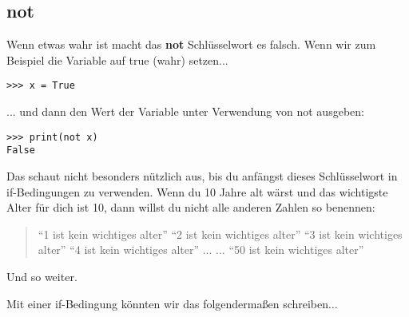 \subsection*{not}

Wenn etwas wahr ist macht das \textbf{not} Schlüsselwort es falsch. Wenn wir zum Beispiel die Variable  auf true (wahr) setzen...

\begin{Verbatim}[frame=single]
>>> x = True
\end{Verbatim}

... und dann den Wert der Variable unter Verwendung von not ausgeben:

\begin{Verbatim}[frame=single]
>>> print(not x)
False
\end{Verbatim}

Das schaut nicht besonders nützlich aus, bis du anfängst dieses Schlüsselwort in if-Bedingungen zu verwenden. Wenn du 10 Jahre alt wärst und das wichtigste Alter für dich ist 10, dann willst du nicht alle anderen Zahlen so benennen:

\begin{quotation}
``1 ist kein wichtiges alter''
``2 ist kein wichtiges alter''
``3 ist kein wichtiges alter''
``4 ist kein wichtiges alter''
...
...
``50 ist kein wichtiges alter''
\end{quotation}

Und so weiter.
\par\noindent
Mit einer if-Bedingung könnten wir das folgendermaßen schreiben$\ldots$

